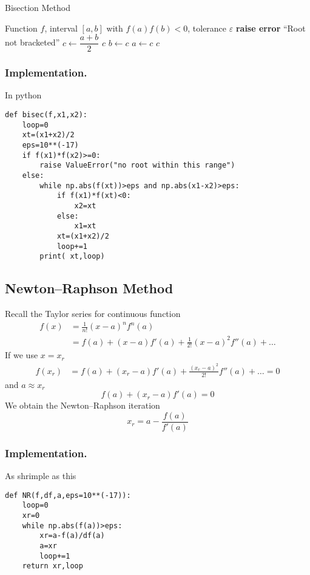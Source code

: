 \documentclass[../../../main.tex]{subfiles}
\begin{document}
\begin{algorithm}
\caption{Bisection Method}
\begin{algorithmic}
\REQUIRE Function $f$, interval $[a,b]$ with $f(a)f(b)<0$, tolerance $\varepsilon$
    \STATE \textbf{raise error} ``Root not bracketed''
\ENDIF
\REPEAT
    \STATE $c \gets \dfrac{a+b}{2}$
        \RETURN $c$
    \ENDIF
        \STATE $b \gets c$
    \ELSE
        \STATE $a \gets c$
    \ENDIF
{}
\RETURN $c$
\end{algorithmic}
\end{algorithm}

\subsubsection{Implementation.}
In python 
\begin{verbatim}
def bisec(f,x1,x2):
    loop=0
    xt=(x1+x2)/2
    eps=10**(-17)
    if f(x1)*f(x2)>=0:
        raise ValueError("no root within this range")
    else:
        while np.abs(f(xt))>eps and np.abs(x1-x2)>eps:
            if f(x1)*f(xt)<0:
                x2=xt 
            else:
                x1=xt 
            xt=(x1+x2)/2
            loop+=1
        print( xt,loop)
\end{verbatim}

\subsection{Newton–Raphson Method}
Recall the Taylor series for continuous function
\begin{align*}
    f(x) & =         \frac{1}{n!}(x-a)^n f^{n}(a)              \\
         & =   f(a)+(x-a)f'(a)+\frac{1}{2!}(x-a)^2f''(a)+\dots
\end{align*}
If we use $x=x_r$
\begin{align*}
    f(x_r) & =  f(a)+(x_r-a)f'(a)+\frac{(x_r-a)^2}{2!}f''(a)+\dots=0
\end{align*}
and $a \approx x_r$
\begin{equation*}
    f(a)+(x_r-a)f'(a)=0
\end{equation*}
We obtain the Newton–Raphson iteration
\begin{equation*}
    x_r=a-\frac{f(a )}{f'(a)}
\end{equation*}

\subsubsection{Implementation.}
As shrimple as this
\begin{verbatim}
def NR(f,df,a,eps=10**(-17)):
    loop=0 
    xr=0
    while np.abs(f(a))>eps:
        xr=a-f(a)/df(a)
        a=xr 
        loop+=1
    return xr,loop
\end{verbatim}
\end{document}
